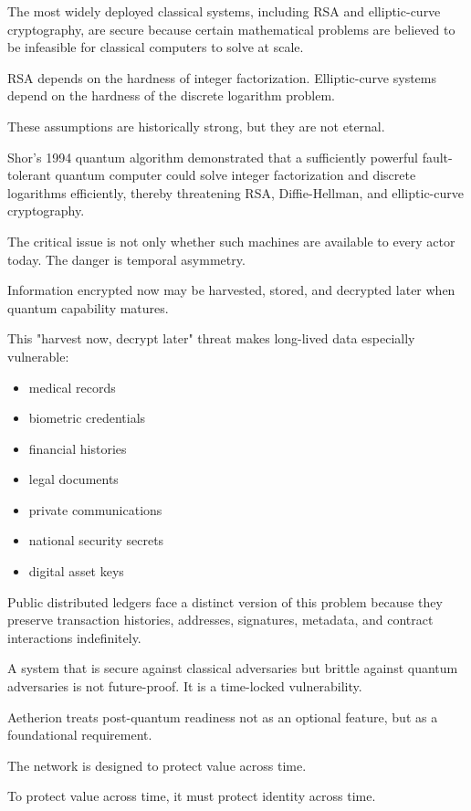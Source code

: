 ﻿\documentclass[12pt]{article}
\begin{document}
The most widely deployed classical systems, including RSA and elliptic-curve cryptography, are secure because certain mathematical problems are believed to be infeasible for classical computers to solve at scale.

RSA depends on the hardness of integer factorization. Elliptic-curve systems depend on the hardness of the discrete logarithm problem.

These assumptions are historically strong, but they are not eternal.

Shor's 1994 quantum algorithm demonstrated that a sufficiently powerful fault-tolerant quantum computer could solve integer factorization and discrete logarithms efficiently, thereby threatening RSA, Diffie-Hellman, and elliptic-curve cryptography.

The critical issue is not only whether such machines are available to every actor today. The danger is temporal asymmetry.

Information encrypted now may be harvested, stored, and decrypted later when quantum capability matures.

This "harvest now, decrypt later" threat makes long-lived data especially vulnerable:

\begin{itemize}
  \item medical records
  \item biometric credentials
  \item financial histories
  \item legal documents
  \item private communications
  \item national security secrets
  \item digital asset keys
\end{itemize}

Public distributed ledgers face a distinct version of this problem because they preserve transaction histories, addresses, signatures, metadata, and contract interactions indefinitely.

A system that is secure against classical adversaries but brittle against quantum adversaries is not future-proof. It is a time-locked vulnerability.

Aetherion treats post-quantum readiness not as an optional feature, but as a foundational requirement.

The network is designed to protect value across time.

To protect value across time, it must protect identity across time.
\end{document}
